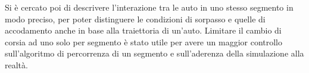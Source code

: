 Si è cercato poi di descrivere l'interazione tra le auto in uno stesso segmento in modo preciso, per poter distinguere le condizioni di sorpasso e quelle di accodamento anche in base alla traiettoria di un'auto. Limitare il cambio di corsia ad uno solo per segmento è stato utile per avere un maggior controllo sull'algoritmo di percorrenza di un segmento e sull'aderenza della simulazione alla realtà.
 
